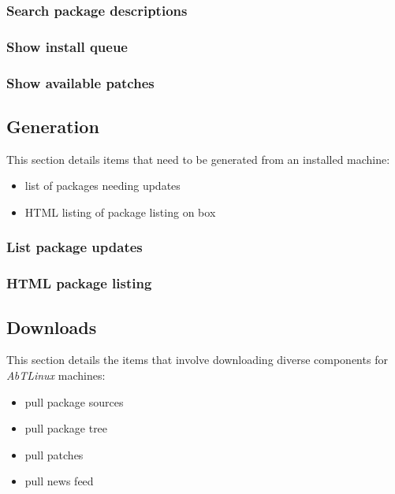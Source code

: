 \subsubsection{Search package descriptions}


\subsubsection{Show install queue}


\subsubsection{Show available patches}



\newpage
\subsection{Generation}
This section details items that need to be generated from an installed
machine:

\begin{itemize}
  \item list of packages needing updates
  \item HTML listing of package listing on box
\end{itemize}

%
%
\subsubsection{List package updates}


\subsubsection{HTML package listing}



\subsection{Downloads}
This section details the items that involve downloading diverse components
for \emph{AbTLinux} machines:

\begin{itemize}
  \item pull package sources
  \item pull package tree
  \item pull patches 
  \item pull news feed 
  \end{itemize}

